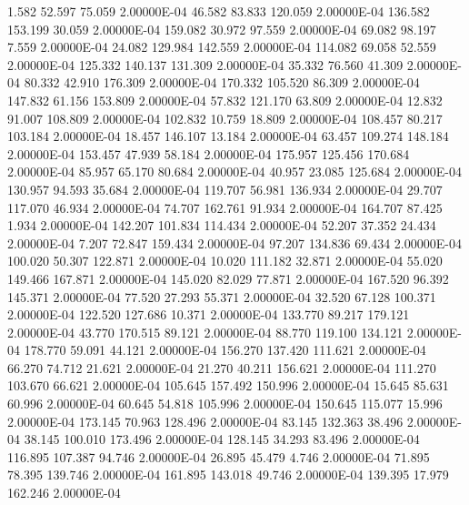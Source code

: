      1.582    52.597    75.059  2.00000E-04
    46.582    83.833   120.059  2.00000E-04
   136.582   153.199    30.059  2.00000E-04
   159.082    30.972    97.559  2.00000E-04
    69.082    98.197     7.559  2.00000E-04
    24.082   129.984   142.559  2.00000E-04
   114.082    69.058    52.559  2.00000E-04
   125.332   140.137   131.309  2.00000E-04
    35.332    76.560    41.309  2.00000E-04
    80.332    42.910   176.309  2.00000E-04
   170.332   105.520    86.309  2.00000E-04
   147.832    61.156   153.809  2.00000E-04
    57.832   121.170    63.809  2.00000E-04
    12.832    91.007   108.809  2.00000E-04
   102.832    10.759    18.809  2.00000E-04
   108.457    80.217   103.184  2.00000E-04
    18.457   146.107    13.184  2.00000E-04
    63.457   109.274   148.184  2.00000E-04
   153.457    47.939    58.184  2.00000E-04
   175.957   125.456   170.684  2.00000E-04
    85.957    65.170    80.684  2.00000E-04
    40.957    23.085   125.684  2.00000E-04
   130.957    94.593    35.684  2.00000E-04
   119.707    56.981   136.934  2.00000E-04
    29.707   117.070    46.934  2.00000E-04
    74.707   162.761    91.934  2.00000E-04
   164.707    87.425     1.934  2.00000E-04
   142.207   101.834   114.434  2.00000E-04
    52.207    37.352    24.434  2.00000E-04
     7.207    72.847   159.434  2.00000E-04
    97.207   134.836    69.434  2.00000E-04
   100.020    50.307   122.871  2.00000E-04
    10.020   111.182    32.871  2.00000E-04
    55.020   149.466   167.871  2.00000E-04
   145.020    82.029    77.871  2.00000E-04
   167.520    96.392   145.371  2.00000E-04
    77.520    27.293    55.371  2.00000E-04
    32.520    67.128   100.371  2.00000E-04
   122.520   127.686    10.371  2.00000E-04
   133.770    89.217   179.121  2.00000E-04
    43.770   170.515    89.121  2.00000E-04
    88.770   119.100   134.121  2.00000E-04
   178.770    59.091    44.121  2.00000E-04
   156.270   137.420   111.621  2.00000E-04
    66.270    74.712    21.621  2.00000E-04
    21.270    40.211   156.621  2.00000E-04
   111.270   103.670    66.621  2.00000E-04
   105.645   157.492   150.996  2.00000E-04
    15.645    85.631    60.996  2.00000E-04
    60.645    54.818   105.996  2.00000E-04
   150.645   115.077    15.996  2.00000E-04
   173.145    70.963   128.496  2.00000E-04
    83.145   132.363    38.496  2.00000E-04
    38.145   100.010   173.496  2.00000E-04
   128.145    34.293    83.496  2.00000E-04
   116.895   107.387    94.746  2.00000E-04
    26.895    45.479     4.746  2.00000E-04
    71.895    78.395   139.746  2.00000E-04
   161.895   143.018    49.746  2.00000E-04
   139.395    17.979   162.246  2.00000E-04
